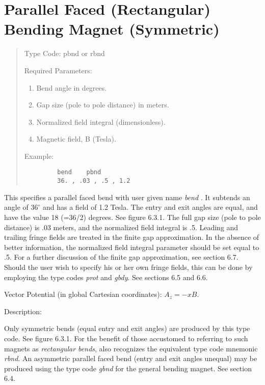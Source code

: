 \newpage
\section{Parallel Faced (Rectangular) Bending Magnet (Symmetric)}
\begin{quotation}
\noindent Type Code:  pbnd or rbnd
\vspace{5mm}

\noindent Required Parameters:
\begin{enumerate}
    \item  Bend angle in degrees.
    \item  Gap size (pole to pole distance) in meters.
    \item  Normalized field integral (dimensionless).
    \item  Magnetic field, B (Tesla).
\end{enumerate}

\vspace{5mm}
\noindent Example:
\begin{verbatim}
         bend    pbnd
         36. , .03 , .5 , 1.2
\end{verbatim}
\end{quotation}
This specifies a parallel faced bend with user given name {\em bend }.   It
subtends an angle of $36^{\circ}$  and has a field of 1.2 Tesla.  The entry and exit
angles are equal, and have the value 18 (=36/2) degrees.  See figure
6.3.1.
The full gap size (pole to pole distance) is .03 meters, and the normalized field integral is .5.  Leading and trailing fringe fields are treated in the finite gap approximation.  In the absence of better information, the normalized field integral parameter should be set equal to .5.  For a further discussion of the finite gap approximation, see section 6.7.  Should the user wish to specify his or her own fringe fields, this can be done by employing the type codes {\em prot } and {\em gbdy}.  See sections 6.5 and 6.6.

\vspace{5mm}
     Vector Potential (in global Cartesian coordinates):  ${\displaystyle A_z  = -xB.}$

\vspace{5mm}
     Description:
\vspace{2mm}

         Only symmetric bends (equal entry and exit angles) are produced by
this type code.  See figure 6.3.1.  For the benefit of those accustomed to referring to such magnets
as {\em rectangular bends}, \Mary also recognizes the equivalent type code
mnemonic {\em rbnd}.  An asymmetric parallel faced bend
(entry and exit angles unequal) may be produced using the type code {\em gbnd }
for the general bending magnet.  See section 6.4.

